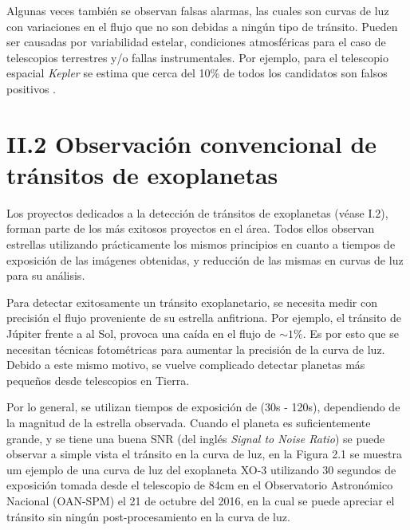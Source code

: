 Algunas veces también se observan falsas alarmas, las cuales son curvas de luz con variaciones en el flujo que no son debidas a ningún tipo de tránsito. Pueden ser causadas por variabilidad estelar, condiciones atmosféricas para el caso de telescopios terrestres y/o fallas instrumentales. Por ejemplo, para el telescopio espacial \textit{Kepler} se estima que cerca del 10\% de todos los candidatos son falsos positivos \cite{fressin2013false}.


\section*{II.2 Observación convencional de tránsitos de exoplanetas}

Los proyectos dedicados a la detección de tránsitos de exoplanetas (véase I.2), forman parte de los más exitosos proyectos en el área. Todos ellos observan estrellas utilizando prácticamente los mismos principios en cuanto a tiempos de exposición de las imágenes obtenidas, y reducción de las mismas en curvas de luz para su análisis.

Para detectar exitosamente un tránsito exoplanetario, se necesita medir con precisión el flujo proveniente de su estrella anfitriona. Por ejemplo, el tránsito de Júpiter frente a al Sol, provoca una caída en el flujo de $\sim 1\%$. Es por esto que se necesitan técnicas fotométricas para aumentar la precisión de la curva de luz. Debido a este mismo motivo, se vuelve complicado detectar planetas más pequeños desde telescopios en Tierra.

Por lo general, se utilizan tiempos de exposición de (30s - 120s), dependiendo de la magnitud de la estrella observada. Cuando el planeta es suficientemente grande, y se tiene una buena SNR (del inglés \textit{Signal to Noise Ratio}) se puede observar a simple vista el tránsito en la curva de luz, en la Figura 2.1 se muestra um ejemplo de una curva de luz del exoplaneta XO-3 \cite{johns2008xo} utilizando 30 segundos de exposición tomada desde el telescopio de 84cm en el Observatorio Astronómico Nacional (OAN-SPM) el 21 de octubre del 2016, en la cual se puede apreciar el tránsito sin ningún post-procesamiento en la curva de luz.

